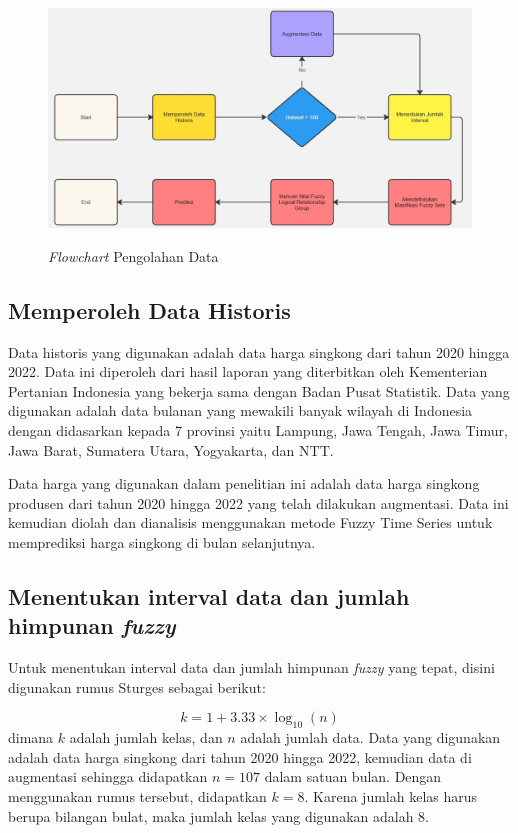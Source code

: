 \documentclass[conference]{IEEEtran}
\begin{document}
\begin{figure}[htbp]
    \centering
    {\includegraphics[scale=0.18]{images/Flowchart.jpg}} 
    \caption{\textit{Flowchart} Pengolahan Data}
\end{figure}


\subsection{Memperoleh Data Historis}
Data historis yang digunakan adalah data harga singkong dari tahun 2020 hingga 2022. Data ini diperoleh dari hasil laporan yang diterbitkan oleh Kementerian Pertanian Indonesia yang bekerja sama dengan Badan Pusat Statistik. Data yang digunakan adalah data bulanan yang mewakili banyak wilayah di Indonesia dengan didasarkan kepada 7 provinsi yaitu Lampung, Jawa Tengah, Jawa Timur, Jawa Barat, Sumatera Utara, Yogyakarta, dan NTT.

Data harga yang digunakan dalam penelitian ini adalah data harga singkong produsen dari tahun 2020 hingga 2022 yang telah dilakukan augmentasi. Data ini kemudian diolah dan dianalisis menggunakan metode Fuzzy Time Series untuk memprediksi harga singkong di bulan selanjutnya.

\subsection{Menentukan interval data dan jumlah himpunan \textit{fuzzy}}\label{AA}
Untuk menentukan interval data dan jumlah himpunan \textit{fuzzy} yang tepat, disini digunakan rumus Sturges sebagai berikut:

\begin{equation}
    k = 1 + 3.33 \times \log_{10}(n)
\end{equation}
dimana $k$ adalah jumlah kelas, dan $n$ adalah jumlah data. Data yang digunakan adalah data harga singkong dari tahun 2020 hingga 2022, kemudian data di augmentasi sehingga didapatkan $n = 107$ dalam satuan bulan. Dengan menggunakan rumus tersebut, didapatkan $k = 8$. Karena jumlah kelas harus berupa bilangan bulat, maka jumlah kelas yang digunakan adalah 8.
\end{document}
